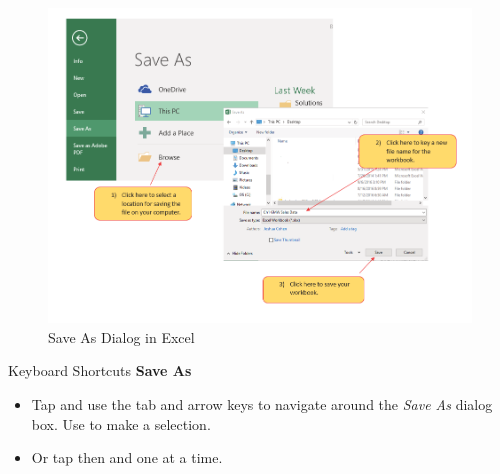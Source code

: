 \begin{figure}[H]
	\centering
	\includegraphics[width=\maxwidth{.95\linewidth}]{gfx/ch01_fig12}
	\caption{Save As Dialog in Excel}
	\label{01:fig12}
\end{figure}

\begin{center}
	\begin{shtcutbox}{Keyboard Shortcuts}
		\textbf{Save As}
		\\
		\begin{itemize}
			\setlength{\itemsep}{0pt}
			\setlength{\parskip}{0pt}
			\setlength{\parsep}{0pt}
			
			\item Tap  and use the tab and arrow keys to navigate around the \textit{Save As} dialog box. Use  to make a selection.
			\item Or tap  then  and  one at a time.
			
		\end{itemize}
	\end{shtcutbox}
\end{center}

